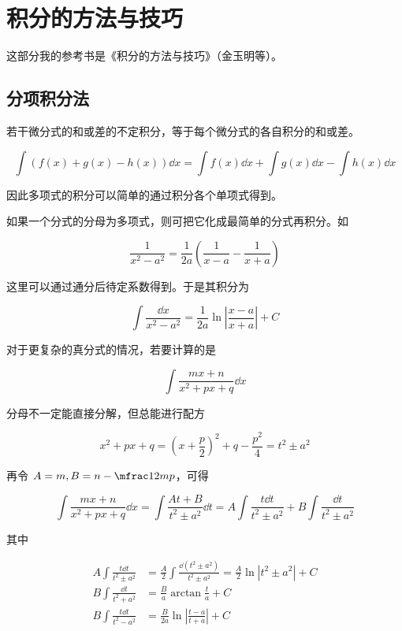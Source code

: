 \chapter{积分的方法与技巧}

这部分我的参考书是《积分的方法与技巧》（金玉明等）。

\section{分项积分法}

若干微分式的和或差的不定积分，等于每个微分式的各自积分的和或差。

$$\int\left( f(x)+g(x)-h(x) \right)\dd x = \int f(x)\dd x + \int g(x)\dd x - \int h(x)\dd x$$

因此多项式的积分可以简单的通过积分各个单项式得到。

如果一个分式的分母为多项式，则可把它化成最简单的分式再积分。如

$$\frac{1}{x^2-a^2} = \frac{1}{2a}\left( \frac{1}{x-a}-\frac{1}{x+a} \right)$$

这里可以通过通分后待定系数得到。于是其积分为

$$\int \frac{\dd x}{x^2-a^2} = \frac{1}{2a}\ln\left|\frac{x-a}{x+a}\right|+C$$

对于更复杂的真分式的情况，若要计算的是

$$\int \frac{mx+n}{x^2+px+q} \dd x$$

分母不一定能直接分解，但总能进行配方

$$x^2+px+q = \left(x+\frac{p}{2}\right)^2+q-\frac{p^2}{4} = t^2 \pm a^2$$

再令 $A=m,B=n-\mfrac12mp$，可得

$$\int \frac{mx+n}{x^2+px+q} \dd x = \int \frac{At+B}{t^2 \pm a^2} \dd t 
= A\int \frac{t\dd t}{t^2 \pm a^2} + B\int \frac{\dd t}{t^2 \pm a^2}$$

其中

\begin{equation*}
    \begin{aligned}
        A\int \frac{t \dd t}{t^2 \pm a^2} &= \frac{A}{2}\int \frac{\dd(t^2 \pm a^2)}{t^2 \pm a^2} = \frac{A}{2} \ln|t^2 \pm a^2| +C \\
        B\int \frac{\dd t}{t^2 + a^2} &= \frac{B}{a}\arctan\frac{t}{a}+C \\
        B\int \frac{t \dd t}{t^2 - a^2} &= \frac{B}{2a}\ln\left|\frac{t-a}{t+a}\right|+C
    \end{aligned}
\end{equation*}

